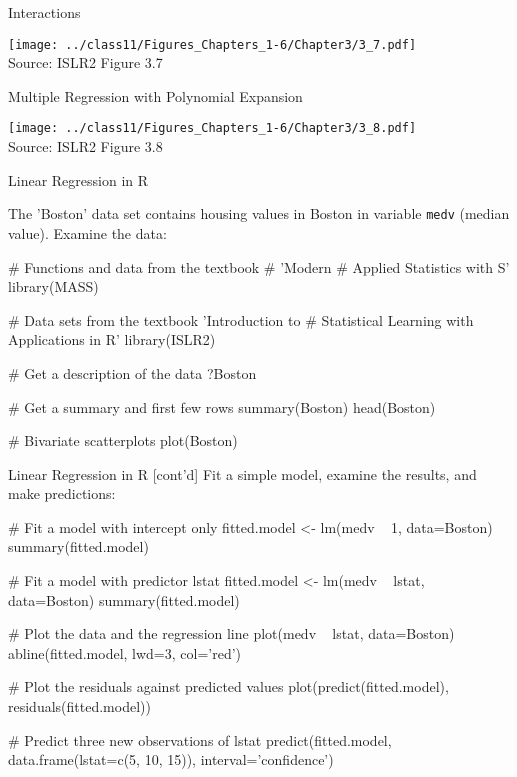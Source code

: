 \documentclass[ignorenonframetext,xcolor=x11names]{beamer}
\begin{document}
\begin{frame}{Interactions}
\centering

\texttt{[image: ../class11/Figures\_Chapters\_1-6/Chapter3/3\_7.pdf]}  \\

\scriptsize Source: ISLR2 Figure 3.7
\end{frame}

\begin{frame}{Multiple Regression with Polynomial Expansion}
\centering

\texttt{[image: ../class11/Figures\_Chapters\_1-6/Chapter3/3\_8.pdf]} \\

\scriptsize Source: ISLR2 Figure 3.8
\end{frame}

\begin{frame}[fragile]{Linear Regression in R}

The 'Boston' data set contains housing values in Boston in variable \texttt{medv} (median value). Examine the data:

\begin{Rcode}
# Functions and data from the textbook # 'Modern 
# Applied Statistics with S'
library(MASS)

# Data sets from the textbook 'Introduction to 
# Statistical Learning with Applications in R'
library(ISLR2)

# Get a description of the data
?Boston

# Get a summary and first few rows
summary(Boston)
head(Boston)

# Bivariate scatterplots
plot(Boston)
\end{Rcode}
\end{frame}

\begin{frame}[fragile]{Linear Regression in R \small [cont'd]}
Fit a simple model, examine the results, and make predictions:
\begin{Rcode}
# Fit a model with intercept only
fitted.model <- lm(medv ~ 1, data=Boston)
summary(fitted.model)

# Fit a model with predictor lstat
fitted.model <- lm(medv ~ lstat, data=Boston)
summary(fitted.model)

# Plot the data and the regression line
plot(medv ~ lstat, data=Boston)
abline(fitted.model, lwd=3, col='red')

# Plot the residuals against predicted values
plot(predict(fitted.model), residuals(fitted.model))

# Predict three new observations of lstat
predict(fitted.model, data.frame(lstat=c(5, 10, 15)),
   interval='confidence')
\end{Rcode}
\end{frame}
\end{document}
